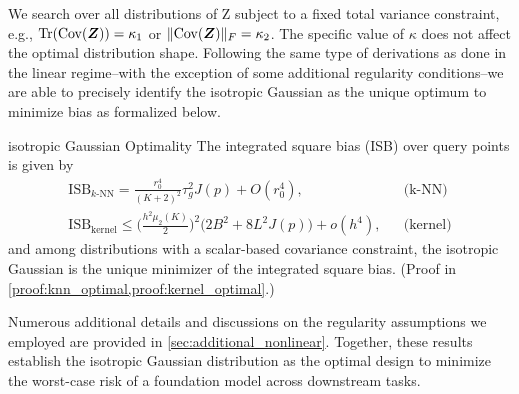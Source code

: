 We search over all distributions of Z subject to a fixed total variance 
constraint, e.g., $\operatorname{Tr}(\mathrm{Cov}({\bm{Z}})) = \kappa_1$ or $\|\mathrm{Cov}({\bm{Z}})\|_F=\kappa_2$. The specific value 
of $\kappa$ does not affect the optimal distribution shape.
Following the same type of derivations as done in the linear regime--with the exception of some additional regularity conditions--we are able to precisely identify the isotropic Gaussian as the unique optimum to minimize bias as formalized below. 



\begin{theorem}[label={thm:nonlinear_optimal}]{isotropic Gaussian Optimality}{}
The integrated square bias (ISB) over query points is given by
\begin{align*}
\text{ISB}_{k\text{-NN}} =\frac{r_0^4}{(K+2)^2}\tau_g^2J(p)+O(r_0^4),&&\text{(k-NN)}\\
\text{ISB}_{\text{kernel}} \le \Big(\frac{h^2\mu_2(K)}{2}\Big)^2 \Big(2 B^2 + 8 L^2J(p)\Big)+o(h^4),&&\text{(kernel)}
\end{align*}
and among distributions with a scalar-based covariance constraint, the isotropic Gaussian  is the unique minimizer of the integrated square bias. (Proof in \cref{proof:knn_optimal,proof:kernel_optimal}.)
\end{theorem}


Numerous additional details and discussions on the regularity assumptions we employed are provided in \cref{sec:additional_nonlinear}.
Together, these results establish the isotropic Gaussian distribution as the optimal design to minimize the worst-case risk of a foundation model across downstream tasks.












